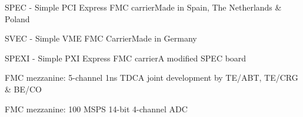 \documentclass[compress,red]{beamer}
\begin{document}
\begin{frame}{SPEC - Simple PCI Express FMC carrier}{Made in Spain, The Netherlands \& Poland}

  \begin{center}
  \end{center}

\end{frame}

\begin{frame}{SVEC - Simple VME FMC Carrier}{Made in Germany}

  \begin{center}
  \end{center}

\end{frame}

\begin{frame}{SPEXI - Simple PXI Express FMC carrier}{A modified SPEC board}

  \begin{center}
  \end{center}

\end{frame}

\begin{frame}{FMC mezzanine: 5-channel 1ns TDC}{A joint development by TE/ABT, TE/CRG \& BE/CO}

  \begin{center}
  \end{center}

\end{frame}

\begin{frame}{FMC mezzanine: 100 MSPS 14-bit 4-channel ADC}

  \begin{center}
  \end{center}

\end{frame}
\end{document}
